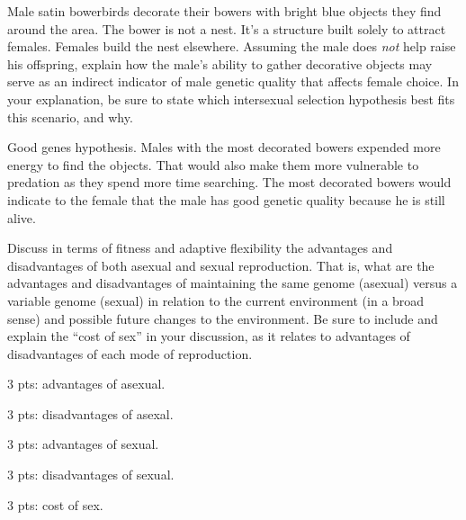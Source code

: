 \question[10]
Male satin bowerbirds decorate their bowers with bright blue objects they find around the area. The bower is not a nest. It's a structure built solely to attract females. Females build the nest elsewhere. Assuming the male does \emph{not} help raise his offspring, explain how the male's ability to gather decorative objects may serve as an indirect indicator of male genetic quality that affects female choice. In your explanation, be sure to state which intersexual selection hypothesis best fits this scenario, and why.
	\begin{solution}
	Good genes hypothesis. Males with the most decorated bowers expended more energy to find the objects. That would also make them more vulnerable to predation as they spend more time searching. The most decorated bowers would indicate to the female that the male has good genetic quality because he is still alive.
	\end{solution}
	

\question[20]%
Discuss in terms of fitness and adaptive flexibility the advantages and disadvantages of both asexual and sexual reproduction. That is, what are the advantages and disadvantages of maintaining the same genome (asexual) versus a variable genome (sexual) in relation to the current environment (in a broad sense) and possible future changes to the environment. Be sure to include and explain the ``cost of sex'' in your discussion, as it relates to advantages of disadvantages of each mode of reproduction.
	\begin{solution}
	3 pts: advantages of asexual.
	
	3 pts: disadvantages of asexal. \vspace{\baselineskip}
	
	3 pts: advantages of sexual.
	
	3 pts: disadvantages of sexual.
	
	3 pts: cost of sex.
	\end{solution}
